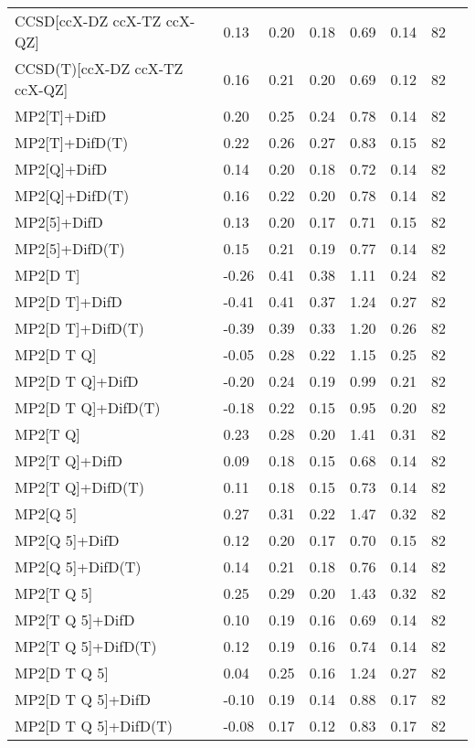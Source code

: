 \begin{table}
\begin{tabular}{l l l l l l l l }
    CCSD[ccX-DZ ccX-TZ ccX-QZ] & 0.13 & 0.20 & 0.18 & 0.69 & 0.14 & 82 \\ 
    CCSD(T)[ccX-DZ ccX-TZ ccX-QZ] & 0.16 & 0.21 & 0.20 & 0.69 & 0.12 & 82 \\ 
    MP2[T]+DifD & 0.20 & 0.25 & 0.24 & 0.78 & 0.14 & 82 \\ 
    MP2[T]+DifD(T) & 0.22 & 0.26 & 0.27 & 0.83 & 0.15 & 82 \\ 
    MP2[Q]+DifD & 0.14 & 0.20 & 0.18 & 0.72 & 0.14 & 82 \\ 
    MP2[Q]+DifD(T) & 0.16 & 0.22 & 0.20 & 0.78 & 0.14 & 82 \\ 
    MP2[5]+DifD & 0.13 & 0.20 & 0.17 & 0.71 & 0.15 & 82 \\ 
    MP2[5]+DifD(T) & 0.15 & 0.21 & 0.19 & 0.77 & 0.14 & 82 \\ 
    MP2[D T] & -0.26 & 0.41 & 0.38 & 1.11 & 0.24 & 82 \\ 
    MP2[D T]+DifD & -0.41 & 0.41 & 0.37 & 1.24 & 0.27 & 82 \\ 
    MP2[D T]+DifD(T) & -0.39 & 0.39 & 0.33 & 1.20 & 0.26 & 82 \\ 
    MP2[D T Q] & -0.05 & 0.28 & 0.22 & 1.15 & 0.25 & 82 \\ 
    MP2[D T Q]+DifD & -0.20 & 0.24 & 0.19 & 0.99 & 0.21 & 82 \\ 
    MP2[D T Q]+DifD(T) & -0.18 & 0.22 & 0.15 & 0.95 & 0.20 & 82 \\ 
    MP2[T Q] & 0.23 & 0.28 & 0.20 & 1.41 & 0.31 & 82 \\ 
    MP2[T Q]+DifD & 0.09 & 0.18 & 0.15 & 0.68 & 0.14 & 82 \\ 
    MP2[T Q]+DifD(T) & 0.11 & 0.18 & 0.15 & 0.73 & 0.14 & 82 \\ 
    MP2[Q 5] & 0.27 & 0.31 & 0.22 & 1.47 & 0.32 & 82 \\ 
    MP2[Q 5]+DifD & 0.12 & 0.20 & 0.17 & 0.70 & 0.15 & 82 \\ 
    MP2[Q 5]+DifD(T) & 0.14 & 0.21 & 0.18 & 0.76 & 0.14 & 82 \\ 
    MP2[T Q 5] & 0.25 & 0.29 & 0.20 & 1.43 & 0.32 & 82 \\ 
    MP2[T Q 5]+DifD & 0.10 & 0.19 & 0.16 & 0.69 & 0.14 & 82 \\ 
    MP2[T Q 5]+DifD(T) & 0.12 & 0.19 & 0.16 & 0.74 & 0.14 & 82 \\ 
    MP2[D T Q 5] & 0.04 & 0.25 & 0.16 & 1.24 & 0.27 & 82 \\ 
    MP2[D T Q 5]+DifD & -0.10 & 0.19 & 0.14 & 0.88 & 0.17 & 82 \\ 
    MP2[D T Q 5]+DifD(T) & -0.08 & 0.17 & 0.12 & 0.83 & 0.17 & 82 \\ 
    \bottomrule
  \end{tabular}
\end{table}
